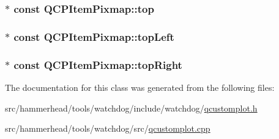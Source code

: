 \subsubsection[{\texorpdfstring{top}{top}}]{$\ast$ const Q\+C\+P\+Item\+Pixmap\+::top}\hypertarget{classQCPItemPixmap_af7a156590b1d59ab21b453c430c56a7c}{}\label{classQCPItemPixmap_af7a156590b1d59ab21b453c430c56a7c}
\subsubsection[{\texorpdfstring{top\+Left}{topLeft}}]{$\ast$ const Q\+C\+P\+Item\+Pixmap\+::top\+Left}\hypertarget{classQCPItemPixmap_a43c281ef6ad46f3cf04f365289abe51a}{}\label{classQCPItemPixmap_a43c281ef6ad46f3cf04f365289abe51a}
\subsubsection[{\texorpdfstring{top\+Right}{topRight}}]{$\ast$ const Q\+C\+P\+Item\+Pixmap\+::top\+Right}\hypertarget{classQCPItemPixmap_a72eabd0010be41a4ec1b22aa983d2aa1}{}\label{classQCPItemPixmap_a72eabd0010be41a4ec1b22aa983d2aa1}


The documentation for this class was generated from the following files\+:\begin{DoxyCompactItemize}
\item 
src/hammerhead/tools/watchdog/include/watchdog/\hyperlink{qcustomplot_8h}{qcustomplot.\+h}\item 
src/hammerhead/tools/watchdog/src/\hyperlink{qcustomplot_8cpp}{qcustomplot.\+cpp}\end{DoxyCompactItemize}
